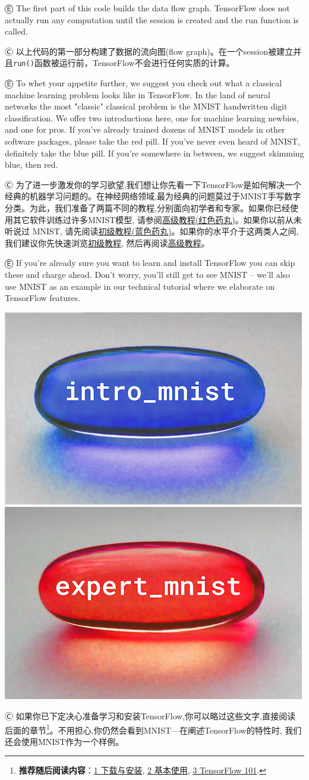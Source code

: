 Ⓔ \textcolor{etc}{The first part of this code builds the data flow graph. TensorFlow does not actually run any computation until the session is created and the run function is called.}

Ⓒ 以上代码的第一部分构建了数据的流向图(flow graph)。在一个session被建立并且\lstinline{run()}函数被运行前，TensorFlow不会进行任何实质的计算。

Ⓔ \textcolor{etc}{To whet your appetite further, we suggest you check out what a classical machine learning problem looks like in TensorFlow. In the land of neural networks the most "classic" classical problem is the MNIST handwritten digit classification. We offer two introductions here, one for machine learning newbies, and one for pros. If you've already trained dozens of MNIST models in other software packages, please take the red pill. If you've never even heard of MNIST, definitely take the blue pill. If you're somewhere in between, we suggest skimming blue, then red.}

Ⓒ 为了进一步激发你的学习欲望,我们想让你先看一下TensorFlow是如何解决一个经典的机器学习问题的。在神经网络领域,最为经典的问题莫过于MNIST手写数字分类。为此，我们准备了两篇不同的教程,分别面向初学者和专家。如果你已经使用其它软件训练过许多MNIST模型, 请参阅\hyperref[MINIST_pros]{高级教程(红色药丸)}。如果你以前从未听说过 MNIST, 请先阅读\hyperref[MINIST_beginner]{初级教程(蓝色药丸)}。如果你的水平介于这两类人之间,我们建议你先快速浏览\hyperref[MINIST_beginner]{初级教程}, 然后再阅读\hyperref[MINIST_pros]{高级教程}。


Ⓔ \textcolor{etc}{If you're already sure you want to learn and install TensorFlow you can skip these and charge ahead. Don't worry, you'll still get to see MNIST -- we'll also use MNIST as an example in our technical tutorial where we elaborate on TensorFlow features.}

\begin{center}
\includegraphics[width=.45\textwidth]{../SOURCE/images/blue_pill.png}
\includegraphics[width=.45\textwidth]{../SOURCE/images/red_pill.png}
\end{center}

Ⓒ 如果你已下定决心准备学习和安装TensorFlow,你可以略过这些文字,直接阅读
后面的章节\footnote{\textbf{推荐随后阅读内容}：\hyperref[download_install]{1 下载与安装}, \hyperref[basic_usage]{2 基本使用}, \hyperref[tf_mech101]{3 TensorFlow 101}.}。不用担心,你仍然会看到MNIST---在阐述TensorFlow的特性时,
我们还会使用MNIST作为一个样例。

